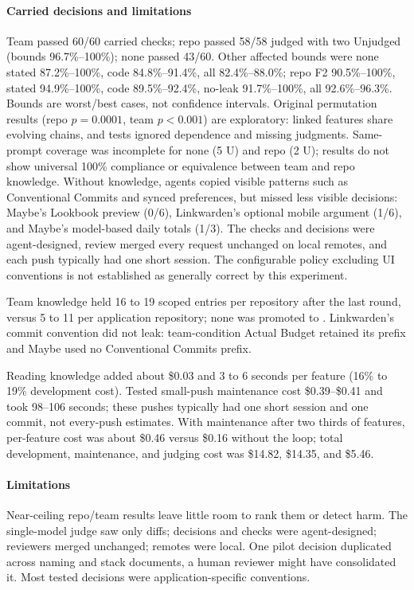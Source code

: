 \paragraph{Carried decisions and limitations} Team passed 60/60 carried checks; repo passed 58/58 judged with two Unjudged (bounds 96.7\%--100\%); none passed 43/60. Other affected bounds were none stated 87.2\%--100\%, code 84.8\%--91.4\%, all 82.4\%--88.0\%; repo F2 90.5\%--100\%, stated 94.9\%--100\%, code 89.5\%--92.4\%, no-leak 91.7\%--100\%, all 92.6\%--96.3\%. Bounds are worst/best cases, not confidence intervals. Original permutation results (repo $p=0.0001$, team $p<0.001$) are exploratory: linked features share evolving chains, and tests ignored dependence and missing judgments. Same-prompt coverage was incomplete for none (5 U) and repo (2 U); results do not show universal 100\% compliance or equivalence between team and repo knowledge. Without knowledge, agents copied visible patterns such as Conventional Commits and synced preferences, but missed less visible decisions: Maybe's  Lookbook preview (0/6), Linkwarden's optional mobile  argument (1/6), and Maybe's model-based daily totals (1/3). The checks and decisions were agent-designed, review merged every request unchanged on local remotes, and each push typically had one short session. The configurable policy excluding UI conventions is not established as generally correct by this experiment.

Team knowledge held 16 to 19 scoped entries per repository after the last round, versus 5 to 11 per application repository; none was promoted to . Linkwarden's commit convention did not leak: team-condition Actual Budget retained its \code{[AI]} prefix and Maybe used no Conventional Commits prefix.

Reading knowledge added about \$0.03 and 3 to 6 seconds per feature (16\% to 19\% development cost). Tested small-push maintenance cost \$0.39--\$0.41 and took 98--106 seconds; these pushes typically had one short session and one commit, not every-push estimates. With maintenance after two thirds of features, per-feature cost was about \$0.46 versus \$0.16 without the loop; total development, maintenance, and judging cost was \$14.82, \$14.35, and \$5.46.

\paragraph{Limitations} Near-ceiling repo/team results leave little room to rank them or detect harm. The single-model judge saw only diffs; decisions and checks were agent-designed; reviewers merged unchanged; remotes were local. One pilot decision duplicated across naming and stack documents, a human reviewer might have consolidated it. Most tested decisions were application-specific conventions.

